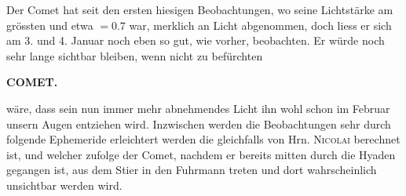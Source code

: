 \par\indent Der Comet hat seit den ersten hiesigen Beobachtungen, wo seine Lichtstärke am grössten und etwa $= 0.7$ war, merklich an Licht abgenommen, doch liess er sich am 3. und 4. Januar noch eben so gut, wie vorher, beobachten. Er würde noch sehr lange sichtbar bleiben, wenn nicht zu befürchten \par
\clearpage
\endgroup
\begingroup
\pagestyle{empty}
\newcommand{\GaussVIGathering}[2]{%
  \fancypagestyle{gaussVIGathering}{%
    \fancyhf{}%
    \renewcommand{\headrulewidth}{0pt}%
    \renewcommand{\footrulewidth}{0pt}%
    \fancyfoot[C]{\makebox[\textwidth][l]{%
      \hspace*{.025\textwidth}{\footnotesize\bfseries #1}\hfill
      {\normalsize\bfseries\textls[90]{#2}}\hspace*{.18\textwidth}}}%
  }%
  \thispagestyle{gaussVIGathering}%
}
\thispagestyle{empty}
\noindent{}%
\makebox[12mm][l]{}%
\parbox[t]{\dimexpr\linewidth-24mm\relax}{\centering\footnotesize\bfseries COMET.\par}%
\par\nobreak\medskip
\noindent wäre, dass sein nun immer mehr abnehmendes Licht ihn wohl schon im Februar unsern Augen entziehen wird. Inzwischen werden die Beobachtungen sehr durch folgende Ephemeride erleichtert werden die gleichfalls von Hrn. \textsc{Nicolai} berechnet ist, und welcher zufolge der Comet, nachdem er bereits mitten durch die Hyaden gegangen ist, aus dem Stier in den Fuhrmann treten und dort wahrscheinlich unsichtbar werden wird.
